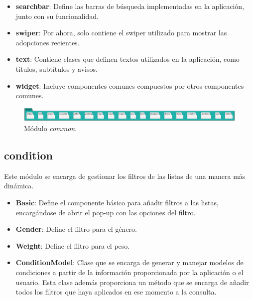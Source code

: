 \documentclass[a4paper, 12pt]{article}
\begin{document}
\begin{itemize}[noitemsep]
	\item \textbf{searchbar}: Define las barras de búsqueda implementadas en la aplicación, junto con su funcionalidad.
	\item \textbf{swiper}: Por ahora, solo contiene el swiper utilizado para mostrar las adopciones recientes.
	\item \textbf{text}: Contiene clases que definen textos utilizados en la aplicación, como títulos, subtítulos y avisos.
	\item \textbf{widget}: Incluye componentes comunes compuestos por otros componentes comunes.
\end{itemize}


\begin{figure}[H]
	\begin{center}
		{\includegraphics[width=0.8\linewidth]{diagram/Common.png}\par}
		\caption{Módulo  \textit{common}.}
	\end{center}
\end{figure}

\subsection*{condition}

Este módulo se encarga de gestionar los filtros de las listas de una manera más dinámica.

\begin{itemize}[noitemsep]
	\item \textbf{Basic}: Define el componente básico para añadir filtros a las listas, encargándose de abrir el pop-up con las opciones del filtro.
	\item \textbf{Gender}: Define el filtro para el género.
	\item \textbf{Weight}: Define el filtro para el peso.
	\item \textbf{ConditionModel}: Clase que se encarga de generar y manejar modelos de condiciones a partir de la información proporcionada por la aplicación o el usuario. Esta clase además proporciona un método que se encarga de añadir todos los filtros que haya aplicados en ese momento a la consulta.
\end{itemize}
\end{document}
